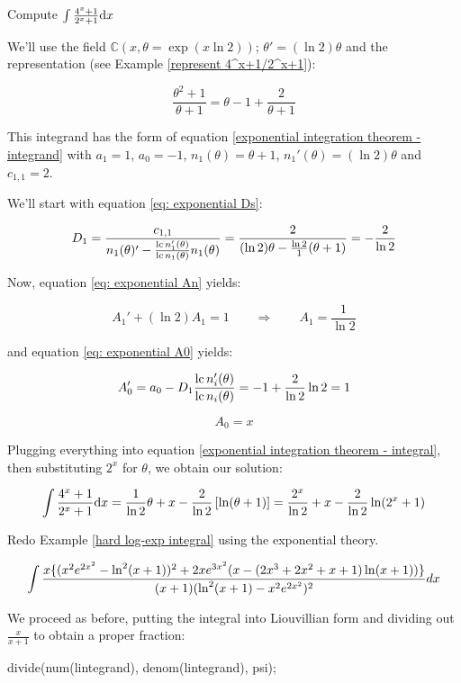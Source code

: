 \vfil\eject

\example Compute $\int {{4^x+1}\over{2^x+1}} {\rm d}x$
\label{integrate 4^x+1/2^x+1}

We'll use the field ${\mathbb C}(x,\theta = \exp(x \ln 2))$; $\theta' =
(\ln 2)\theta$ and the representation (see Example
\ref{represent 4^x+1/2^x+1}):

$$ \frac{\theta^2+1}{\theta+1} = \theta-1+\frac{2}{\theta+1}$$

This integrand has the form of equation
\eqref{exponential integration theorem - integrand}
with $a_1=1$, $a_0=-1$, $n_1(\theta)=\theta+1$,
$n_1'(\theta) = (\ln 2)\theta$ and $c_{1,1}=2$.

We'll start with equation
\eqref{eq: exponential Ds}:

$$ D_1 = \frac{c_{1,1}}{n_1(\theta)' - \frac{{\rm lc\,} n_1'(\theta)}{{\rm lc\,} n_1(\theta)} n_1(\theta)} = \frac{2}{(\ln 2) \theta - \frac{\ln 2}{1} (\theta +1 )} = -\frac{2}{\ln 2}$$

Now, equation \eqref{eq: exponential An} yields:

$$A_1' + (\ln 2) A_1 = 1 \qquad\Longrightarrow\qquad A_1 = \frac{1}{\ln 2}$$

and equation \eqref{eq: exponential A0} yields:

$$A_0' = a_0 - D_1 \frac{{\rm lc\,} n_i'(\theta)}{{\rm lc\,} n_i(\theta)} = -1 + \frac{2}{\ln 2} \ln 2 = 1$$

$$A_0 = x$$

Plugging everything into equation \eqref{exponential integration theorem - integral},
then substituting $2^x$ for $\theta$,
we obtain our solution:

$$\int {{4^x+1}\over{2^x+1}} {\rm d}x = \frac{1}{\ln 2}\theta + x  - \frac{2}{\ln 2}\left[\ln(\theta+1)\right] =
\frac{2^x}{\ln 2} + x - \frac{2}{\ln 2}\ln(2^x+1) $$

\endexample

\vfill\eject

\example
Redo Example \ref{hard log-exp integral} using the exponential theory.

$$\int{{x\{(x^2e^{2x^2}-\ln^2(x+1))^2+2xe^{3x^2}(x-(2x^3+2x^2+x+1)\ln(x+1))\}}\over{(x+1)(\ln^2(x+1) - x^2e^{2x^2})^2}} dx$$

We proceed as before, putting the integral into Liouvillian form
and dividing out $\frac{x}{x+1}$ to obtain a proper fraction:

\begin{maximablock}
divide(num(lintegrand), denom(lintegrand), psi);
\end{maximablock}

